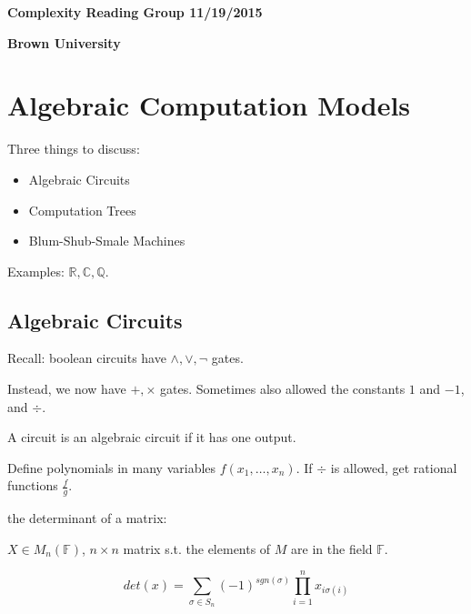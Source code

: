 \documentclass[11pt]{article} %
\begin{document}
\centerline{\LARGE{\bf Complexity Reading Group 11/19/2015}}
\vspace{2mm}
\centerline{\Large {\bf Brown University}}

\section{Algebraic Computation Models}

Three things to discuss:
\begin{itemize}
\item Algebraic Circuits
\item Computation Trees
\item Blum-Shub-Smale Machines
\end{itemize}


Examples: $\mathbb{R}, \mathbb{C}, \mathbb{Q}$.


\subsection{Algebraic Circuits}

Recall: boolean circuits have $\wedge, \vee, \neg$ gates.

Instead, we now have $+, \times$ gates. Sometimes also allowed the constants $1$ and $-1$, and $\div$.

A circuit is an algebraic circuit if it has one output.

Define polynomials in many variables $f(x_1, \ldots, x_n)$. If $\div$ is allowed, get rational functions $\frac{f}{g}$.


\midline

 the determinant of a matrix:

$X \in M_n(\mathbb{F})$, $n \times n$ matrix s.t. the elements of $M$ are in the field $\mathbb{F}$.

\begin{equation}
det(x) = \sum_{\sigma \in S_n} (-1)^{sgn(\sigma)} \prod_{i=1}^n x_{i\sigma(i)}
\end{equation}
\end{document}
